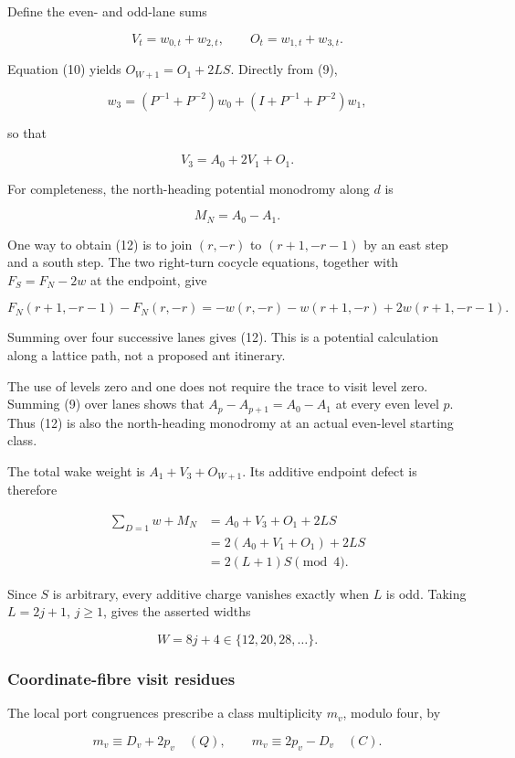 \documentclass[11pt,letterpaper]{article}
\theoremstyle{plain}
\theoremstyle{definition}
\begin{document}
\begin{NoHyper}
Define the even- and odd-lane sums

\[
V_t=w_{0,t}+w_{2,t},\qquad O_t=w_{1,t}+w_{3,t}.
\]

Equation (10) yields \(O_{W+1}=O_1+2LS\). Directly from (9),

\[
w_3=(P^{-1}+P^{-2})w_0+(I+P^{-1}+P^{-2})w_1,
\]

so that

\[
V_3=A_0+2V_1+O_1.
\tag{11}
\]

For completeness, the north-heading potential monodromy along \(d\) is

\[
M_N=A_0-A_1.
\tag{12}
\]

One way to obtain (12) is to join \((r,-r)\) to \((r+1,-r-1)\) by an east step and a south step. The two right-turn cocycle equations, together with \(F_S=F_N-2w\) at the endpoint, give

\[
F_N(r+1,-r-1)-F_N(r,-r)
=-w(r,-r)-w(r+1,-r)+2w(r+1,-r-1).
\]

Summing over four successive lanes gives (12). This is a potential calculation along a lattice path, not a proposed ant itinerary.

The use of levels zero and one does not require the trace to visit level zero. Summing (9) over lanes shows that \(A_p-A_{p+1}=A_0-A_1\) at every even level \(p\). Thus (12) is also the north-heading monodromy at an actual even-level starting class.

The total wake weight is \(A_1+V_3+O_{W+1}\). Its additive endpoint defect is therefore

\[
\begin{aligned}
\sum_{D=1}w+M_N
&=A_0+V_3+O_1+2LS\\
&=2(A_0+V_1+O_1)+2LS\\
&=2(L+1)S\pmod4.
\end{aligned}
\tag{13}
\]

Since \(S\) is arbitrary, every additive charge vanishes exactly when \(L\) is odd. Taking \(L=2j+1\), \(j\ge1\), gives the asserted widths

\[
W=8j+4\in\{12,20,28,\ldots\}.
\]

\subsubsection{Coordinate-fibre visit residues}

The local port congruences prescribe a class multiplicity \(m_v\), modulo four, by

\[
m_v\equiv D_v+2p_v\quad(Q),\qquad
m_v\equiv2p_v-D_v\quad(C).
\]


\end{NoHyper}
\end{document}
